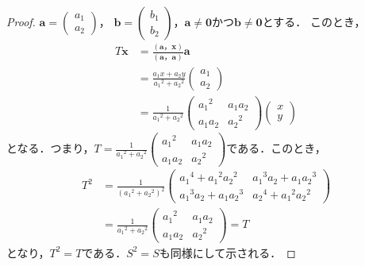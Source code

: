 \documentclass[dvipdfmx,uplatex,11pt]{jsarticle}
\theoremstyle{definition}
\begin{document}
\begin{leftbar}
    \begin{proof}
    $\bm{a}=
    \left(
        \begin{array}{c}
            a_1 \\
            a_2
        \end{array}
    \right)
    $，
    $\bm{b}=
    \left(
        \begin{array}{c}
            b_1 \\
            b_2
        \end{array}
    \right)
    $，$\bm{a} \ne \bm{0}$かつ$\bm{b} \ne \bm{0}$とする．
    このとき，
    \begin{align*}
        T \bm{x} &=\frac{(\bm{a}，\bm{x})}{(\bm{a}，\bm{a})} \bm{a} \\
        & = \frac{a_1 x + a_2 y}{{a_1}^2+{a_2}^2} 
        \begin{pmatrix}
            a_1 \\
            a_2
        \end{pmatrix}
        \\
        & =
        \frac{1}{{a_1}^2+{a_2}^2}
        \begin{pmatrix}
            {a_1}^2 & a_1 a_2 \\
            a_1 a_2 & {a_2}^2
        \end{pmatrix}
        \begin{pmatrix}
            x \\
            y
        \end{pmatrix}
    \end{align*}
    となる．つまり，$T=\frac{1}{{a_1}^2+{a_2}^2}
    \begin{pmatrix}
        {a_1}^2 & a_1 a_2 \\
        a_1 a_2 & {a_2}^2
    \end{pmatrix}
    $である．このとき，
    \begin{align*}
        T^2 &= \frac{1}{({a_1}^2+{a_2}^2)^2}
        \begin{pmatrix}
            {a_1}^4 + {a_1}^2 {a_2}^2 & {a_1}^3 a_2 + a_1 {a_2}^3 \\
            {a_1}^3 a_2 + a_1 {a_2}^3 & {a_2}^4 + {a_1}^2 {a_2}^2
        \end{pmatrix}
        \\
        &= \frac{1}{{a_1}^2+{a_2}^2}
        \begin{pmatrix}
            {a_1}^2 & a_1 a_2 \\
            a_1 a_2 & {a_2}^2
        \end{pmatrix}
        =T
    \end{align*}
    となり，$T^2=T$である．$S^2=S$も同様にして示される．
\end{proof}
\end{leftbar}
\end{document}
